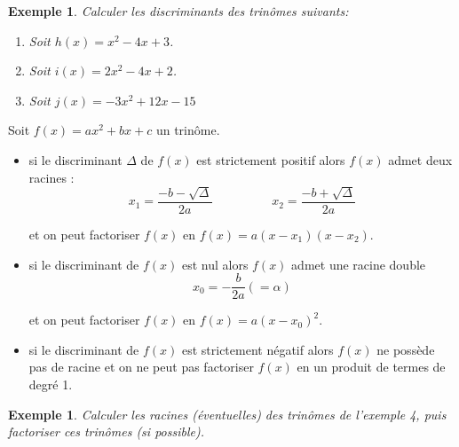 \documentclass[a4paper,11pt]{article}
\theoremstyle{break}
\newcounter{enonce}
\newtheorem{exemple}[enonce]{Exemple}
\begin{document}
  \begin{exemple}
    
    Calculer les discriminants des trinômes suivants:
    \begin{enumerate}
     \item Soit $h(x)=x^2-4x+3$.
     \item Soit $i(x)=2x^2-4x+2$.
     \item Soit $j(x)=-3x^2+12x-15$
    \end{enumerate}
   \end{exemple}
  
  \begin{theorem}[Central]
    Soit $f(x)=ax^2+bx+c$ un trinôme.
    \begin{itemize}
     \item  si le discriminant $\Delta$ de $f(x)$ est strictement positif alors
     $f(x)$ admet deux racines :
     $$x_1=\frac{-b-\sqrt{\Delta}}{2a} \hspace{2cm} x_2=\frac{-b+\sqrt{\Delta}}{2a}$$
     
     et on peut factoriser $f(x)$ en $f(x)=a(x-x_1)(x-x_2)$.
     
     \item si le discriminant de $f(x)$ est nul alors $f(x)$ admet une racine double
     $$x_0=-\frac{b}{2a}(=\alpha)$$
     
     et on peut factoriser $f(x)$ en $f(x)=a(x-x_0)^2$.
     
     \item si le discriminant de $f(x)$ est strictement négatif alors
     $f(x)$ ne possède pas de racine et on ne peut pas factoriser $f(x)$ en un produit de termes de degré 1.
    \end{itemize}    
  \end{theorem}
  
  \begin{exemple}
    Calculer les racines (éventuelles) des trinômes de l'exemple 4, puis factoriser
    ces trinômes (si possible).
   \end{exemple}
  
  \newpage
  
\end{document}
